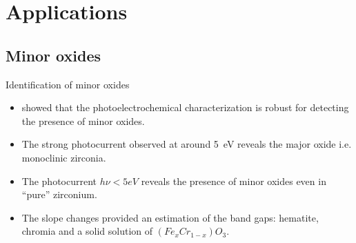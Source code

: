 \documentclass[10pt,compress]{beamer}
\begin{document}
\section{Applications}
\subsection{Minor oxides}
    \begin{frame}[allowframebreaks=1.0]{Identification of minor oxides}
        \begin{itemize}
            \item \citet{benaboud2007} showed that the photoelectrochemical characterization 
                  is robust for detecting the presence of minor oxides. 
            \item The strong photocurrent observed at around 5~eV 
                  reveals the major oxide i.e. monoclinic zirconia. 
            \item The photocurrent $h\nu < 5 eV$ reveals the presence of minor 
                  oxides even in “pure” zirconium. 
            \item The slope changes provided an estimation of the band gaps: 
                  hematite, chromia and a solid solution of $(Fe_xCr_{1-x})O_3$. 
        \end{itemize}


\end{frame}
\end{document}

